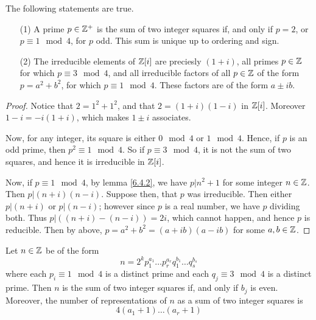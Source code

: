 \begin{theorem}\label{lemma_6.4.4}
  The following statements are true.
  \begin{enumerate}
    \item[(1)] A prime $p \in \mathbb{Z}^+$ is the sum of two integer squares if,
      and only if  $p=2$, or  $p \equiv 1 \mod{4}$, for $p$ odd. This sum
      is unique up to ordering and sign.

    \item[(2)] The irreducible elements of $\mathbb{Z}[i]$ are preciesly $(1+i)$,
      all primes $p \in \mathbb{Z}$ for which  $p \equiv 3 \mod{4}$, and all
      irreducible factors of all $p \in \mathbb{Z}$ of the form $p=a^2+b^2$, for
      which  $p \equiv 1 \mod{4}$. These factors are of the form $a \pm
      ib$.
  \end{enumerate}
\end{theorem}
\begin{proof}
  Notice that $2=1^2+1^2$, and that  $2=(1+i)(1-i)$ in $\mathbb{Z}[i]$. Moreover
  $1-i=-i(1+i)$, which makes $1 \pm i$ associates.

  Now, for any integer, its square is either $0 \mod{4}$ or $1 \mod{4}$.
  Hence, if $p$ is an odd prime, then $p^2 \equiv 1 \mod{4}$. So if $p \equiv
  3 \mod{4}$, it is not the sum of two squares, and hence it is irreducible in
  $\mathbb{Z}[i]$.

  Now, if $p \equiv 1 \mod{4}$, by lemma \ref{6.4.2}, we have $p|n^2+1$ for
  some integer  $n \in \mathbb{Z}$. Then  $p|(n+i)(n-i)$. Suppose then, that $p$ was
  irreducible. Then either $p|(n+i)$ or $p|(n-i)$; however since $p$ is a real
  number, we have $p$ dividing both. Thus $p|((n+i)-(n-i))=2i$, which cannot
  happen, and hence $p$ is reducible. Then by above, $p=a^2+b^2=(a+ib)(a-ib)$
  for some $a,b \in \mathbb{Z}$.
\end{proof}
\begin{corollary}
  Let $n \in \mathbb{Z}$ be of the form
  \begin{equation*}
    n=2^kp_1^{a_1} \dots p_r^{a_r}q_1^{b_1} \dots q_s^{b_s}
  \end{equation*}
  where each $p_i \equiv 1 \mod{4}$ is a distinct prime and each $q_j \equiv 3
  \mod{4}$ is a distinct prime. Then $n$ is the sum of two integer squares if,
  and only if $b_j$ is even. Moreover, the number of representations of $n$ as
  a sum of two integer squares is
  \begin{equation*}
    4(a_1+1) \dots (a_r+1)
  \end{equation*}
\end{corollary}
